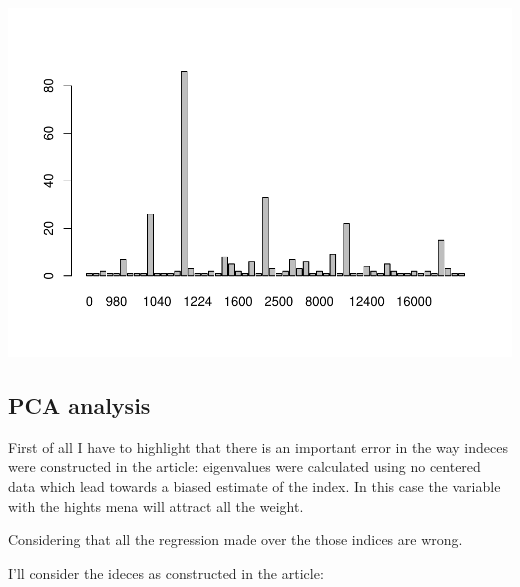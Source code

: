 \documentclass[]{article}
\newenvironment{Shaded}{\begin{snugshade}}{\end{snugshade}}
\newcommand{\KeywordTok}[1]{\textcolor[rgb]{0.13,0.29,0.53}{\textbf{#1}}}
\newcommand{\DecValTok}[1]{\textcolor[rgb]{0.00,0.00,0.81}{#1}}
\newcommand{\StringTok}[1]{\textcolor[rgb]{0.31,0.60,0.02}{#1}}
\newcommand{\CommentTok}[1]{\textcolor[rgb]{0.56,0.35,0.01}{\textit{#1}}}
\newcommand{\OperatorTok}[1]{\textcolor[rgb]{0.81,0.36,0.00}{\textbf{#1}}}
\newcommand{\NormalTok}[1]{#1}
\begin{document}
\includegraphics{ProvidentRegressions_files/figure-latex/unnamed-chunk-3-2.pdf}

\begin{Shaded}
\end{Shaded}

\subsection{PCA analysis}\label{pca-analysis}

First of all I have to highlight that there is an important error in the
way indeces were constructed in the article: eigenvalues were calculated
using no centered data which lead towards a biased estimate of the
index. In this case the variable with the hights mena will attract all
the weight.

Considering that all the regression made over the those indices are
wrong.

I'll consider the ideces as constructed in the article:
\end{document}

